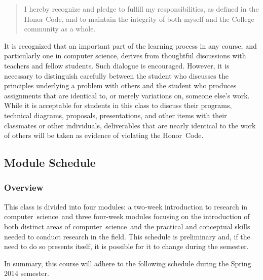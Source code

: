 \vspace*{-.1in}
\begin{quote}
I hereby recognize and pledge to fulfill my responsibilities, as defined in the Honor Code, and to maintain the
integrity of both myself and the College community as a whole.  
\end{quote}
\vspace*{-.15in}

\noindent It is recognized that an important part of the learning process in any course, and particularly one in
computer science, derives from thoughtful discussions with teachers and fellow students.  Such dialogue is encouraged.
However, it is necessary to distinguish carefully between the student who discusses the principles underlying a problem
with others and the student who produces assignments that are identical to, or merely variations on, someone else's
work.  While it is acceptable for students in this class to discuss their programs, technical diagrams, proposals,
presentations, and other items with their classmates or other individuals, deliverables that are nearly identical to the
work of others will be taken as evidence of violating the \mbox{Honor Code}.

\vspace{-.20in}
\subsection*{Module Schedule}

\subsubsection*{Overview}

This class is divided into four modules: a two-week introduction to research in \mbox{computer science and} three
four-week modules focusing on the introduction of both distinct areas of \mbox{computer science and} the practical and
conceptual skills needed to conduct research in the field.  This schedule is preliminary and, if the need to do so
presents itself, it is possible for it to change during the semester.

\noindent
In summary, this course will adhere to the following schedule during the Spring 2014 semester.  

